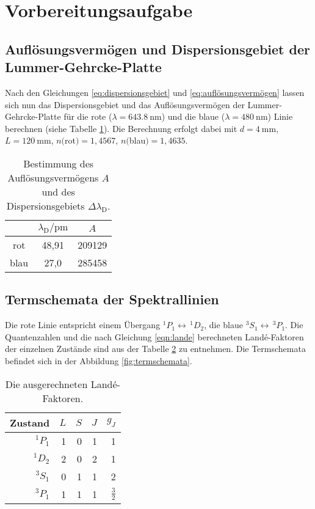 \section{Vorbereitungsaufgabe}

\subsection{Auflösungsvermögen und Dispersionsgebiet der Lummer-Gehrcke-Platte}
Nach den Gleichungen \ref{eq:dispersionsgebiet} und \ref{eq:auflösungsvermögen} lassen sich nun das Dispersionsgebiet und das Auflösungsvermögen der Lummer-Gehrcke-Platte für die rote ($\lambda=\SI{643,8}{\nano\meter}$) und die blaue ($\lambda=\SI{480}{\nano\meter}$) Linie berechnen (siehe Tabelle \ref{tab:auflösungsunddispersion}). Die Berechnung erfolgt dabei mit $d=\SI{4}{\milli\meter}$, $L=\SI{120}{\milli\meter}$, $n($rot$)=1,4567$, $n($blau$)=1,4635$.
	
\begin{table}[htpb]
	\centering
	\caption{Bestimmung des Auflösungsvermögens $A$ und des Dispersionsgebiets $\Delta\lambda_\text{D}$.}
	\label{tab:auflösungsunddispersion}
	\begin{tabular}{c c c}
		\toprule
		& $\lambda_\text{D} / \si{\pico\meter}$ & $A$ \\
		\midrule
		rot & 48,91 & 209129 \\
		blau & 27,0 & 285458 \\ 
		\bottomrule
	\end{tabular}
\end{table}

\subsection{Termschemata der Spektrallinien}

Die rote Linie entspricht einem Übergang $^1P_1\longleftrightarrow\,^1D_2$, die blaue $^3S_1\longleftrightarrow\,^3P_1$. Die Quantenzahlen und die nach Gleichung \eqref{eqn:lande} berechneten Landé-Faktoren der einzelnen Zustände sind aus der Tabelle \ref{tab:lande} zu entnehmen.
Die Termschemata befindet sich in der Abbildung \ref{fig:termschemata}. 
\begin{table}[h!]
	\centering
	\begin{tabular}{r|rrr|r}
		\hline\hline
		Zustand & $L$	&	$S$	&	$J$	&	$g_J$\\
		\hline\hline
		$^1P_1$ &	1	&	0	&	1	&	1\\
		$^1D_2$ &	2	&	0	&	2	&	1\\
		$^3S_1$ &	0	&	1	&	1	&	2\\
		$^3P_1$ &	1	&	1	&	1	&	$\frac{3}{2}$\\
		\hline
	\end{tabular}
	\caption{Die ausgerechneten Landé-Faktoren.}
	\label{tab:lande}
\end{table}

